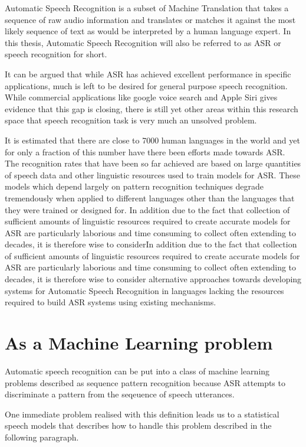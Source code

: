 Automatic Speech Recognition is a subset of Machine Translation that takes a sequence of raw audio information and translates or matches it against the most likely sequence of text as would be interpreted by a human language expert.  In this thesis, Automatic Speech Recognition will also be referred to as 
ASR or speech recognition for short.

It can be argued that while ASR has achieved excellent performance in specific applications, much is left to be desired for general purpose speech recognition. While commercial applications like google voice search and Apple Siri gives evidence that this gap is closing, there is still yet other areas within this research space that speech recognition task is very much an unsolved problem.

It is estimated that there are close to 7000 human languages in the world and yet for only a fraction of this number have there been efforts made towards ASR.  The recognition rates that have been so far achieved are based on large quantities of speech data and other linguistic resources used to train models for ASR. These models which depend largely on pattern recognition techniques degrade tremendously  when applied to different languages other than the languages that they were trained or designed for.  In addition due to the fact that collection of sufficient amounts of linguistic resources required to create accurate models for ASR are particularly laborious and time consuming to collect often extending to decades, it is therefore wise to considerIn addition due to the fact that collection of sufficient amounts of linguistic resources required to create accurate models for ASR are particularly laborious and time consuming to collect often extending to decades, it is therefore wise to consider alternative approaches towards developing systems for Automatic Speech Recognition in languages lacking the resources required to build ASR systems using existing mechanisms.

\section{As a Machine Learning  problem}
\pagestyle{plain}
Automatic speech recognition can be put into a class of machine learning problems described as sequence pattern recognition because ASR attempts to discriminate a pattern from the seqeuence of speech utterances. 

One immediate problem realised with this definition leads us to a statistical speech models that describes how to handle this problem described in the following paragraph.

